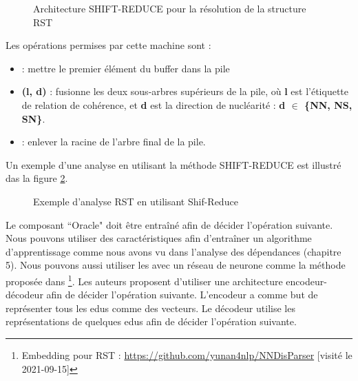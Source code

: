 \documentclass{KodeBook}
\begin{document}
\begin{figure}[!ht]
	\centering
	\caption{Architecture SHIFT-REDUCE pour la résolution de la structure RST}
	\label{fig:rst-shift-reduce}
\end{figure}

Les opérations permises par cette machine sont :
\begin{itemize}
	\item {} : mettre le premier élément du buffer dans la pile
	\item {}\textbf{(l, d)} : fusionne les deux sous-arbres supérieurs de la pile, où \textbf{l} est l'étiquette de relation de cohérence, et \textbf{d} est la direction de nucléarité : \textbf{d $ \in $ \{NN, NS, SN\}}.
	\item {} : enlever la racine de l'arbre final de la pile.
\end{itemize}
Un exemple d'une analyse  en utilisant la méthode SHIFT-REDUCE est illustré das la figure \ref{fig:rst-shred-yu-al}.

\begin{figure}[!ht]
	\centering
	
	\caption[Exemple d'analyse RST en utilisant Shif-Reduce]{Exemple d'analyse RST en utilisant Shif-Reduce \cite{2018-yu-al}}
	\label{fig:rst-shred-yu-al}
\end{figure}

Le composant ``Oracle" doit être entraîné afin de décider l'opération suivante. 
Nous pouvons utiliser des caractéristiques afin d'entraîner un algorithme d'apprentissage comme nous avons vu dans l'analyse des dépendances (chapitre 5). 
Nous pouvons aussi utiliser les  avec un réseau de neurone comme la méthode proposée dans \cite{2018-yu-al}\footnote{Embedding pour RST : \url{https://github.com/yunan4nlp/NNDisParser} [visité le 2021-09-15]}. 
Les auteurs proposent d'utiliser une architecture encodeur-décodeur afin de décider l'opération suivante. 
L'encodeur a comme but de représenter tous les \acp{edu} comme des vecteurs.
Le décodeur utilise les représentations de quelques \acp{edu} afin de décider l'opération suivante. 
\end{document}
